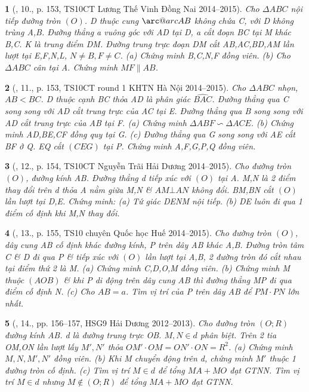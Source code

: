 \documentclass{article}
\makeatletter
\newcommand{\arc@char}{{\usefont{U}{tipa}{m}{n}\symbol{62}}}%
\newcommand{\arc}[1]{\mathpalette\arc@arc{#1}}
\newcommand{\arc@arc}[2]{%
	\sbox0{$\m@th#1#2$}%
	\vbox{
		\hbox{\resizebox{\wd0}{\height}{\arc@char}}
		\nointerlineskip
		\box0
	}%
}
\newtheorem{baitoan}{}
\makeatother
\begin{document}
\begin{baitoan}[\cite{Thu_Chung_Viet_Minh_circ}, 10., p. 153, TS10CT Lương Thế Vinh Đồng Nai 2014--2015]
	Cho $\Delta ABC$ nội tiếp đường tròn $(O)$. D thuộc cung $\arc{AB}$ không chứa C, với D không trùng A,B. Đường thẳng a vuông góc với AD tại D, a cắt đoạn BC tại M khác B,C. K là trung điểm DM. Đường trung trực đoạn DM cắt AB,AC,BD,AM lần lượt tại E,F,N,L, $N\ne B,F\ne C$. (a) Chứng minh B,C,N,F đồng viên. (b) Cho $\Delta ABC$ cân tại A. Chứng minh $MF\parallel AB$.
\end{baitoan}

\begin{baitoan}[\cite{Thu_Chung_Viet_Minh_circ}, 11., p. 153, TS10CT round 1 KHTN Hà Nội 2014--2015]
	Cho $\Delta ABC$ nhọn, $AB < BC$. D thuộc cạnh BC thỏa AD là phân giác $\widehat{BAC}$. Đường thẳng qua C song song với AD cắt trung trực của AC tại E. Đường thẳng qua B song song với AD cắt trung trực của AB tại F. (a) Chứng minh $\Delta ABF\backsim\Delta ACE$. (b) Chứng minh AD,BE,CF đồng quy tại G. (c) Đường thẳng qua G song song với AE cắt BF ở Q. EQ cắt $(CEG)$ tại P. Chứng minh A,F,G,P,Q đồng viên.
\end{baitoan}

\begin{baitoan}[\cite{Thu_Chung_Viet_Minh_circ}, 12., p. 154, TS10CT Nguyễn Trãi Hải Dương 2014--2015]
	Cho đường tròn $(O)$, đường kính AB. Đường thẳng d tiếp xúc với $(O)$ tại A. M,N là 2 điểm thay đổi trên d thỏa A nằm giữa M,N \& $AM\bot AN$ không đổi. BM,BN cắt $(O)$ lần lượt tại D,E. Chứng minh: (a) Tứ giác DENM nội tiếp. (b) DE luôn đi qua 1 điểm cố định khi M,N thay đổi.
\end{baitoan}

\begin{baitoan}[\cite{Thu_Chung_Viet_Minh_circ}, 13., p. 155, TS10 chuyên Quốc học Huế 2014--2015]
	Cho đường tròn $(O)$, dây cung AB cố định khác đường kính, P trên dây AB khác A,B. Đường tròn tâm C \& D đi qua P \& tiếp xúc với $(O)$ lần lượt tại A,B, 2 đường tròn đó cắt nhau tại điểm thứ 2 là M. (a) Chứng minh C,D,O,M đồng viên. (b) Chứng minh M thuộc $(AOB)$ \& khi P di động trên dây cung AB thì đường thẳng MP đi qua điểm cố định N. (c) Cho $AB = a$. Tìm vị trí của P trên dây AB để $PM\cdot PN$ lớn nhất.
\end{baitoan}

\begin{baitoan}[\cite{Thu_Chung_Viet_Minh_circ}, 14., pp. 156--157, HSG9 Hải Dương 2012--2013]
	Cho đường tròn $(O;R)$ đường kính AB. d là đường trung trực OB. $M,N\in d$ phân biệt. Trên 2 tia OM,ON lần lượt lấy $M',N'$ thỏa $OM'\cdot OM = ON'\cdot ON = R^2$. (a) Chứng minh $M,N,M',N'$ đồng viên. (b) Khi M chuyển động trên d, chứng minh $M'$ thuộc 1 đường tròn cố định. (c) Tìm vị trí $M\in d$ để tổng $MA + MO$ đạt {\rm GTNN}. Tìm vị trí $M\in d$ nhưng $M\notin(O;R)$ để tổng $MA + MO$ đạt {\rm GTNN}.
\end{baitoan}
\end{document}
